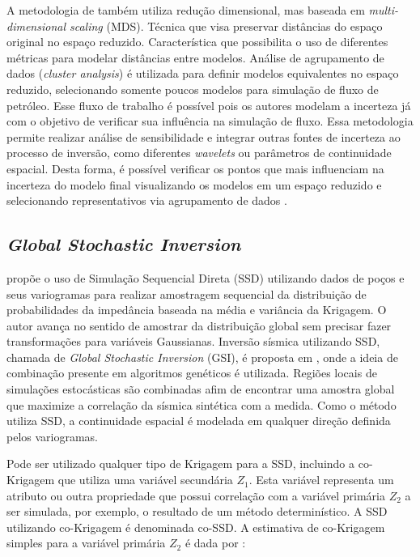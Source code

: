 A metodologia de \cite{caers_distance_kernels_MDS} também utiliza redução
dimensional, mas baseada em \textit{multi-dimensional scaling} (MDS). Técnica
que visa preservar distâncias do espaço original no espaço reduzido.
Característica que possibilita o uso de diferentes métricas para modelar
distâncias entre modelos. Análise de agrupamento de dados (\textit{cluster
analysis}) é utilizada para definir modelos equivalentes no espaço reduzido,
selecionando somente poucos modelos para simulação de fluxo de petróleo. Esse
fluxo de trabalho é possível pois os autores modelam a incerteza já com o
objetivo de verificar sua influência na simulação de fluxo. Essa metodologia
permite realizar análise de sensibilidade e integrar outras fontes de incerteza
ao processo de inversão, como diferentes \textit{wavelets} ou parâmetros de
continuidade espacial. Desta forma, é possível verificar os pontos que mais
influenciam na incerteza do modelo final visualizando os modelos em um espaço
reduzido e selecionando representativos via agrupamento de dados \citep[p.
188]{caers2011modeling}.

\subsection{\textit{Global Stochastic Inversion}}

\cite{2001amilcarDSS} propõe o uso de Simulação Sequencial Direta (SSD)
utilizando dados de poços e seus variogramas para realizar amostragem sequencial
da distribuição de probabilidades da impedância baseada na média e variância da
Krigagem. O autor avança no sentido de amostrar da distribuição global sem
precisar fazer transformações para variáveis Gaussianas. Inversão sísmica
utilizando SSD, chamada de \textit{Global Stochastic Inversion} (GSI), é
proposta em \cite{amilcarInversao}, onde a ideia de combinação presente em algoritmos
genéticos é utilizada. Regiões locais de simulações estocásticas são combinadas
afim de encontrar uma amostra global que maximize a correlação da sísmica
sintética com a medida. Como o método utiliza SSD, a continuidade espacial é
modelada em qualquer direção definida pelos variogramas.

Pode ser utilizado qualquer tipo de Krigagem para a SSD, incluindo a co-Krigagem
que utiliza uma variável secundária $Z_1$. Esta variável representa um
atributo ou outra propriedade que possui correlação com a variável primária $Z_2$ a ser
simulada, por exemplo, o resultado de um método determinístico. A SSD utilizando
co-Krigagem é denominada co-SSD. A estimativa de co-Krigagem simples para a
variável primária $Z_2$ é dada por \citep{2001amilcarDSS}:


